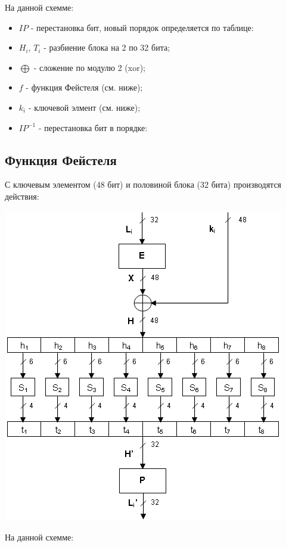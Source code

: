 На данной схемме:
\begin{itemize}
\item $IP$ \-- перестановка бит, новый порядок определяется по таблице:
\item $H_i$, $T_i$ \-- разбиение блока на 2 по 32 бита;
\item $\bigoplus$ \-- сложение по модулю 2 (xor);
\item $f$ \-- функция Фейстеля (см. ниже);
\item $k_i$ \-- ключевой элмент (см. ниже);
\item $IP^{-1}$ \-- перестановка бит в порядке:
\end{itemize}


\subsection{Функция Фейстеля}
С ключевым элементом (48 бит) и половиной блока (32 бита) производятся действия:
\begin{center}
\includegraphics[scale=0.5]{des_f}
\end{center}
На данной схемме:
